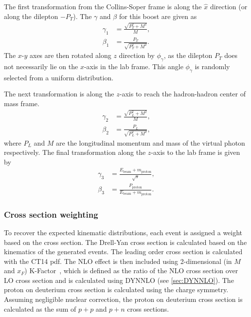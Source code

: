 \documentclass[../main.tex]{subfiles}
\begin{document}
The first transformation from the Collins-Soper frame is along the $\hat{x}$ direction (or along the dilepton $-P_T$).
The $\gamma$ and $\beta$ for this boost are given as
\begin{equation}
	\begin{split}
		\gamma_1 & = \frac{\sqrt{P_T^2 + M^2}}{M},   \\
		\beta_1  & = \frac{P_T}{\sqrt{P_T^2 + M^2}}.
	\end{split}
\end{equation}
The $x$-$y$ axes are then rotated along $z$ direction by $\phi_\gamma$, as the dilepton $P_T$
does not necessarily lie on the $x$-axis in the lab frame.
This angle $\phi_\gamma$ is randomly selected from a uniform distribution.

The next transformation is along the $z$-axis to reach the hadron-hadron center of mass frame.
\begin{equation}
	\begin{split}
		\gamma_2 & = \frac{\sqrt{P_L^2 + M^2}}{M},   \\
		\beta_2  & = \frac{P_L}{\sqrt{P_L^2 + M^2}},
	\end{split}
\end{equation}
where $P_L$ and $M$ are the longitudinal momentum and mass of the virtual photon respectively.
The final transformation along the $z$-axis to the lab frame is given by
\begin{equation}
	\begin{split}
		\gamma_3 & = \frac{E_{\mathrm{beam}}+m_{\mathrm{proton}}}{\sqrt{s}},            \\
		\beta_3  & = \frac{P_{\mathrm{proton}}}{E_{\mathrm{beam}}+m_{\mathrm{proton}}}.
	\end{split}
\end{equation}

\subsubsection{Cross section weighting}
To recover the expected kinematic distributions,
each event is assigned a weight based on the cross section.
The Drell-Yan cross section is calculated based on the kinematics of the generated events.
The leading order cross section is calculated with the CT14 pdf.
The NLO effect is then included using 2-dimensional (in $M$ and $x_F$) K-Factor~\cite{shivangi-1747}, which
is defined as the ratio of the NLO cross section over LO cross section and is
calculated using DYNNLO (see \cref{sec:DYNNLO}).
The proton on deuterium cross section is calculated using the charge symmetry.
Assuming negligible nuclear correction, the proton on deuterium cross section is calculated
as the sum of $p+p$ and $p+n$ cross sections.
\end{document}

